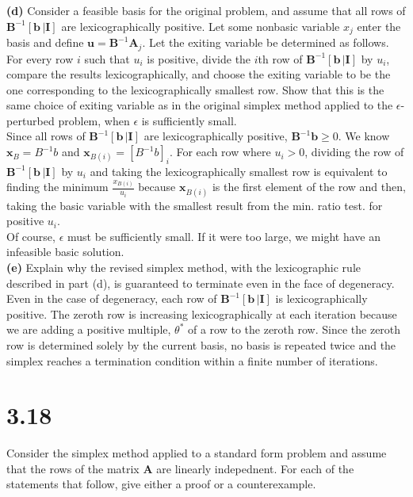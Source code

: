 \documentclass{article}
\begin{document}
\noindent
\textbf{(d)} Consider a feasible basis for the original problem, and assume that all rows of $\mathbf{B}^{-1} [\mathbf{b} \, | \mathbf{I}]$ are lexicographically positive.  Let some nonbasic variable $x_j$ enter the basis and define $\mathbf{u} = \mathbf{B}^{-1}\mathbf{A}_j$.  Let the exiting variable be determined as follows.  For every row $i$ such that $u_i$ is positive, divide the $i$th row of $\mathbf{B}^{-1} [\mathbf{b} \, | \mathbf{I}]$ by $u_i$, compare the results lexicographically, and choose the exiting variable to be the one corresponding to the lexicographically smallest row.  Show that this is the same choice of exiting variable as in the original simplex method applied to the $\epsilon$-perturbed problem, when $\epsilon$ is sufficiently small. \\


\noindent
Since all rows of $\mathbf{B}^{-1} [\mathbf{b} \, | \mathbf{I}]$ are lexicographically positive, $\mathbf{B}^{-1} \mathbf{b} \geq 0$.  We know $\mathbf{x}_B = B^{-1}b$ and $\mathbf{x}_{B(i)} = [B^{-1}b]_i$.  For each row where $u_i > 0$, dividing the row of $\mathbf{B}^{-1} [\mathbf{b} \, | \mathbf{I}]$ by $u_i$ and taking the lexicographically smallest row is equivalent to finding the minimum $\frac{x_{B(i)}}{u_i}$ because $\mathbf{x}_{B(i)}$ is the first element of the row and then, taking the basic variable with the smallest result from the min. ratio test. for positive $u_i$.\\

\noindent Of course, $\epsilon$ must be sufficiently small.  If it were too large, we might have an infeasible basic solution.\\

\noindent
\textbf{(e)}  Explain why the revised simplex method, with the lexicographic rule described in part (d), is guaranteed to terminate even in the face of degeneracy.  \\

\noindent
Even in the case of degeneracy, each row of $\mathbf{B}^{-1} [\mathbf{b} \, | \mathbf{I}]$ is lexicographically positive.  The zeroth row is increasing lexicographically at each iteration because we are adding a positive multiple, $\theta^*$ of a row to the zeroth row.  Since the zeroth row is determined solely by the current basis, no basis is repeated twice and the simplex reaches a termination condition within a finite number of iterations.


\section*{3.18} 
Consider the simplex method applied to a standard form problem and assume that the rows of the matrix \textbf{A} are linearly indepednent.  For each of the statements that follow, give either a proof or a counterexample.\\
\end{document}
